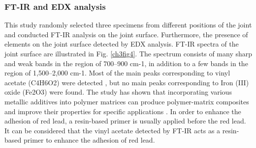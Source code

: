 \subsubsection{FT-IR and EDX analysis}

This study randomly selected three specimens from different positions of the joint and conducted FT-IR analysis on the joint surface. Furthermore, the presence of elements on the joint surface detected by EDX analysis. FT-IR spectra of the joint surface are illustrated in Fig. \ref{ch3fig4}. The spectrum consists of many sharp and weak bands in the region of 700–900 cm-1, in addition to a few bands in the region of 1,500–2,000 cm-1. Most of the main peaks corresponding to vinyl acetate (C4H6O2) were detected \cite{baskaran2004Vibrational}, but no main peaks corresponding to Iron (III) oxide (Fe2O3) were found. The study has shown that incorporating various metallic additives into polymer matrices can produce polymer-matrix composites and improve their properties for specific applications \cite{dong2006Polyvinylbutyral}. In order to enhance the adhesion of red lead, a resin-based primer is usually applied before the red lead. It can be considered that the vinyl acetate detected by FT-IR acts as a resin-based primer to enhance the adhesion of red lead.

